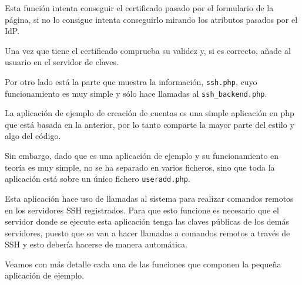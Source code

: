\begin{itemize}
\begin{lstlisting}
    \end{lstlisting}

    Esta función intenta conseguir el certificado pasado por el formulario
    de la página, si no lo consigue intenta conseguirlo mirando los
    atributos pasados por el IdP.

    Una vez que tiene el certificado comprueba su validez y, si es
    correcto, añade al usuario en el servidor de claves.

    \end{itemize}

    Por otro lado está la parte que muestra la información,
    \texttt{ssh.php}, cuyo funcionamiento es muy simple y sólo hace
    llamadas al \texttt{ssh\_backend.php}.

    La aplicación de ejemplo de creación de cuentas es una simple
    aplicación en php que está basada en la anterior, por lo tanto
    comparte la mayor parte del estilo y algo del código.

    Sin embargo, dado que es una aplicación de ejemplo y su
    funcionamiento en teoría es muy simple, no se ha separado en
    varios ficheros, sino que toda la aplicación está sobre un único
    fichero \texttt{useradd.php}.

    Esta aplicación hace uso de llamadas al sistema para realizar
    comandos remotos en los servidores SSH registrados. Para que esto
    funcione es necesario que el servidor donde se ejecute esta
    aplicación tenga las claves públicas de los demás servidores,
    puesto que se van a hacer llamadas a comandos remotos a través de
    SSH y esto debería hacerse de manera automática.

    Veamos con más detalle cada una de las funciones que componen la
    pequeña aplicación de ejemplo.

